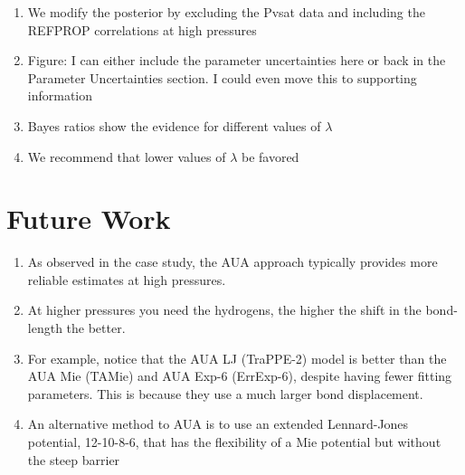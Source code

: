 \documentclass[journal=jctc,manuscript=article]{achemso}
\begin{document}
\begin{enumerate}
	\item We modify the posterior by excluding the Pvsat data and including the REFPROP correlations at high pressures
	\item Figure: I can either include the parameter uncertainties here or back in the Parameter Uncertainties section. I could even move this to supporting information
	\item Bayes ratios show the evidence for different values of $\lambda$
	\item We recommend that lower values of $\lambda$ be favored
\end{enumerate}

\section{Future Work}
\begin{enumerate}
	\item As observed in the case study, the AUA approach typically provides more reliable estimates at high pressures.
	\item At higher pressures you need the hydrogens, the higher the shift in the bond-length the better.
	\item For example, notice that the AUA LJ (TraPPE-2) model is better than the AUA Mie (TAMie) and AUA Exp-6 (ErrExp-6), despite having fewer fitting parameters. This is because they use a much larger bond displacement.
	\item An alternative method to AUA is to use an extended Lennard-Jones potential, 12-10-8-6, that has the flexibility of a Mie potential but without the steep barrier
\end{enumerate}
 
\end{document}
